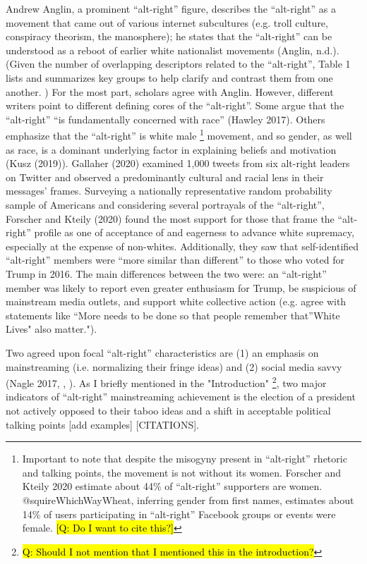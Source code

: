 \documentclass[acmlarge, screen, authorversion]{acmart}
\begin{document}
Andrew Anglin, a prominent ``alt-right” figure, describes the ``alt-right”
as a movement that came out of various internet subcultures (e.g. troll
culture, conspiracy theorism, the manosphere); he states that the “alt-right” can be understood as a reboot of earlier
white nationalist movements (Anglin, n.d.). (Given the number of
overlapping descriptors related to the “alt-right”, Table 1 lists and
summarizes key groups to help clarify and contrast them from one
another. ) For the most part, scholars agree with Anglin. However, different writers point to different defining cores of the
``alt-right''. Some argue that the “alt-right” “is fundamentally concerned
with race” (Hawley 2017). Others emphasize that the “alt-right” is white
male \footnote{Important to note that despite the misogyny present in
“alt-right” rhetoric and talking points, the movement is not without its
women. Forscher and Kteily 2020 estimate about 44\% of “alt-right”
supporters are women. @squireWhichWayWheat, inferring gender from first
names, estimates about 14\% of users participating in “alt-right”
Facebook groups or events were female. \hl{[Q: Do I want to cite this?]}}
movement, and so gender, as well as race, is a dominant underlying
factor in explaining beliefs and motivation (Kusz (2019)). Gallaher (2020)
examined 1,000 tweets from six alt-right leaders on Twitter and observed
a predominantly cultural and racial lens in their messages’ frames.
Surveying a nationally representative random probability sample of
Americans and considering several portrayals of the “alt-right”,
Forscher and Kteily (2020) found the most support for those that frame
the “alt-right” profile as one of acceptance of and eagerness to advance
white supremacy, especially at the expense of non-whites. Additionally,
they saw that self-identified “alt-right” members were “more similar
than different” to those who voted for Trump in 2016. The main
differences between the two were: an “alt-right” member was likely to
report even greater enthusiasm for Trump, be suspicious of mainstream
media outlets, and support white collective action (e.g. agree with
statements like “More needs to be done so that people remember
that”White Lives" also matter.").

Two agreed upon focal “alt-right” characteristics are (1) an emphasis on
mainstreaming (i.e. normalizing their fringe ideas) and (2) social media
savvy (Nagle 2017, \cite{sternProudBoysWhite2019},
\cite{gallaherMainstreamingWhiteSupremacy2020}). As I briefly mentioned in the
"Introduction" \footnote{\hl{Q: Should I not mention that I mentioned this in the
introduction?}}, two major indicators of “alt-right” mainstreaming
achievement is the election of a president not actively opposed to their
taboo ideas and a shift in acceptable political talking points [add
examples] [CITATIONS].
\end{document}
